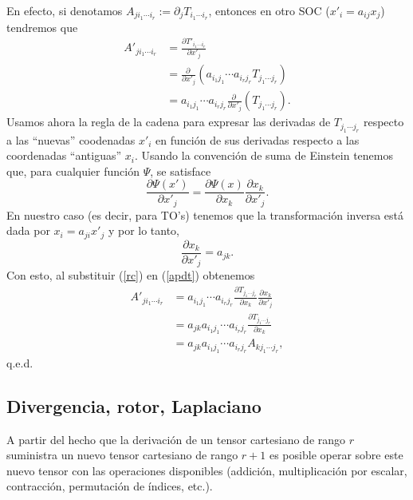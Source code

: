 En efecto, si denotamos $A_{ji_1\cdots i_r}:=\partial_jT_{i_1\cdots i_r}$, entonces en otro SOC ($x'_i=a_{ij}x_j$) tendremos que
\begin{align}
A'_{ji_1\cdots i_r} &= \frac{\partial T'_{i_1\cdots i_r}}{\partial x'_j} \\
&= \frac{\partial\ }{\partial x'_j}\left(a_{i_1j_1}\cdots a_{i_rj_r}T_{j_1\cdots j_r}\right) \\
&= a_{i_1j_1}\cdots a_{i_rj_r}\frac{\partial\ }{\partial x'_j}\left(T_{j_1\cdots j_r}\right) . \label{apdt}
\end{align}
Usamos ahora la regla de la cadena para expresar las derivadas de $T_{j_1\cdots j_r}$ respecto a las ``nuevas'' coodenadas $x'_i$ en función de sus derivadas respecto a las coordenadas ``antiguas'' $x_i$. Usando la convención de suma de Einstein tenemos que, para cualquier función $\Psi$, se satisface
\begin{equation}\label{rc}
\frac{\partial\Psi(x')}{\partial x'_j}=\frac{\partial\Psi(x)}{\partial x_k}\frac{\partial x_k}{\partial x'_j}.
\end{equation}
En nuestro caso (es decir, para TO's) tenemos que la transformación inversa está dada por $x_i=a_{ji}x'_j$ y por lo tanto, 
\begin{equation}
\frac{\partial x_k}{\partial x'_j}=a_{jk}.
\end{equation}
Con esto, al substituir (\ref{rc}) en (\ref{apdt}) obtenemos
\begin{align}
A'_{ji_1\cdots i_r} &= a_{i_1j_1}\cdots a_{i_rj_r} \frac{\partial T_{j_1\cdots j_r}}{\partial x_k}\frac{\partial x_k}{\partial x'_j}  \\
&= a_{jk}a_{i_1j_1}\cdots a_{i_rj_r} \frac{\partial T_{j_1\cdots j_r}}{\partial x_k} \\
&= a_{jk}a_{i_1j_1}\cdots a_{i_rj_r} A_{kj_1\cdots j_r},
\end{align}
q.e.d.

\subsection{Divergencia, rotor, Laplaciano}
A partir del hecho que la derivación de un tensor cartesiano de rango $r$ suministra un nuevo tensor cartesiano de rango $r+1$ es posible operar sobre este nuevo tensor con las operaciones disponibles (addición, multiplicación por escalar, contracción, permutación de índices, etc.). 

